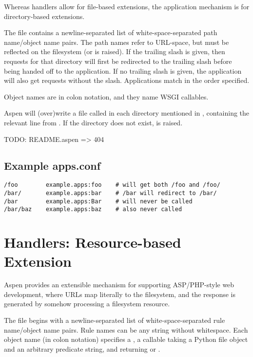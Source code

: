Whereas handlers allow for file-based extensions, the application mechanism is
for directory-based extensions.

The  file contains a newline-separated list of
white-space-separated path name/object name pairs. The path names refer to
URL-space, but must be reflected on the filesystem (or  is
raised). If the trailing slash is given, then requests for that directory will
first be redirected to the trailing slash before being handed off to the
application. If no trailing slash is given, the application will also get
requests without the slash. Applications match in the order specified.

Object names are in colon notation, and they name WSGI callables.

Aspen will (over)write a file called  in each directory
mentioned in , containing the relevant line from
. If the directory does not exist,  is
raised.

TODO: README.aspen => 404


\subsection{Example apps.conf \label{apps.conf}}

\begin{verbatim}
/foo        example.apps:foo    # will get both /foo and /foo/
/bar/       example.apps:bar    # /bar will redirect to /bar/
/bar        example.apps:Bar    # will never be called
/bar/baz    example.apps:baz    # also never called
\end{verbatim}


\section{Handlers: Resource-based Extension \label{handlers}}

Aspen provides an extensible mechanism for supporting ASP/PHP-style web
development, where URLs map literally to the filesystem, and the response is
generated by somehow processing a filesystem resource.

The  file begins with a newline-separated list of
white-space-separated rule name/object name pairs. Rule names can be any string
without whitespace. Each object name (in colon notation) specifies a ,
a callable taking a Python file object and an arbitrary predicate string, and
returning  or .

